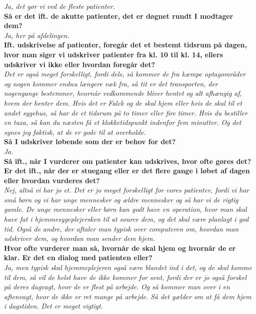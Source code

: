 \noindent
\textit{Ja, det gør vi ved de fleste patienter.}\\
\noindent
\textbf{Så er det ift. de akutte patienter, det er døgnet rundt I modtager dem?}\\
\noindent
\textit{Ja, her på afdelingen.}\\
\noindent
\textbf{Ift. udskrivelse af patienter, foregår det et bestemt tidsrum på dagen, hvor man siger vi udskriver patienter fra kl. 10 til kl. 14, ellers udskriver vi ikke eller hvordan foregår det?}\\
\noindent
\textit{Det er også meget forskelligt, fordi dels, så kommer de fra kæmpe optagområder og nogen kommer endnu længere væk fra, så tit er det transporten, der nogengange bestemmer, hvornår vedkommende bliver hentet og alt afhængig af, hvem der henter dem. Hvis det er Falck og de skal hjem eller hvis de skal til et andet sygehus, så har de et tidsrum på to timer eller fire timer. Hvis du bestiller en taxa, så kan du næsten få et klokketidspunkt indenfor fem minutter. Og det synes jeg faktisk, at de er gode til at overholde.}\\ 
\noindent
\textbf{Så I udskriver løbende som der er behov for det?}\\
\noindent
\textit{Ja.}\\
\noindent
\textbf{Så ift., når I vurderer om patienter kan udskrives, hvor ofte gøres det? Er det ift., når der er stuegang eller er det flere gange i løbet af dagen eller hvordan vurderes det?}\\
\noindent
\textit{Nej, altså vi har jo et. Det er jo meget forskelligt for vores patienter, fordi vi har små børn og vi har unge mennesker og ældre mennesker og så har vi de rigtig gamle. De unge mennesker eller børn kan godt have en operation, hvor man skal have fat i hjemmesygeplejersken til at source dem, og det skal være planlagt i god tid. Også de andre, der aftaler man typisk over computeren om, hvordan man udskriver dem, og hvordan man sender dem hjem.}\\
\noindent
\textbf{Hvor ofte vurderer man så, hvornår de skal hjem og hvornår de er klar. Er det en dialog med patienten eller?}\\
\noindent
\textit{Ja, men typisk skal hjemmeplejeren også være blandet ind i det, og de skal komme til dem, så vil de helst have de ikke kommer for sent, fordi der er jo også forskel på deres dagvagt, hvor de er flest på arbejde. Og så kommer man over i en aftenvagt, hvor de ikke er ret mange på arbejde. Så det gælder om at få dem hjem i dagstiden. Det er meget vigtigt.}\\
